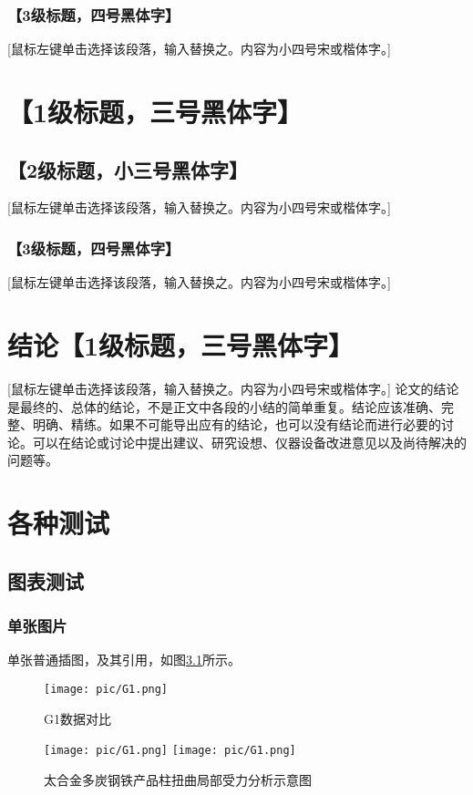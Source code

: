 \documentclass{bjtu-bachelor-thesis}
\begin{document}
\subsection{【3级标题，四号黑体字】 }
[鼠标左键单击选择该段落，输入替换之。内容为小四号宋或楷体字。]

\chapter{【1级标题，三号黑体字】}
\section{【2级标题，小三号黑体字】 }
 [鼠标左键单击选择该段落，输入替换之。内容为小四号宋或楷体字。]
\subsection{【3级标题，四号黑体字】 }
[鼠标左键单击选择该段落，输入替换之。内容为小四号宋或楷体字。]

\chapter{结论【1级标题，三号黑体字】 }
 [鼠标左键单击选择该段落，输入替换之。内容为小四号宋或楷体字。] 论文的结论是最终的、总体的结论，不是正文中各段的小结的简单重复。结论应该准确、完整、明确、精练。如果不可能导出应有的结论，也可以没有结论而进行必要的讨论。可以在结论或讨论中提出建议、研究设想、仪器设备改进意见以及尚待解决的问题等。

\chapter{各种测试}
\section{图表测试}
\subsection{单张图片}
单张普通插图，及其引用，如图\ref{fig:G1}所示。

\begin{figure}[!htp]
    \centering
    \texttt{[image: pic/G1.png]}
    \caption{G1数据对比\label{fig:G1}}
\end{figure}

\begin{figure}
    \centering
    {\texttt{[image: pic/G1.png]}}
    {\texttt{[image: pic/G1.png]}}
    \caption{太合金多炭钢铁产品柱扭曲局部受力分析示意图}\label{fig:2}
\end{figure}
\end{document}

